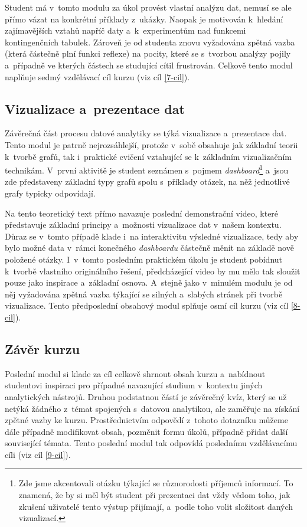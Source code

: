 Student má v~tomto modulu za úkol provést vlastní analýzu dat, nemusí se ale přímo vázat na konkrétní příklady z~ukázky. Naopak je motivován k~hledání zajímavějších vztahů napříč daty a~k~experimentům nad funkcemi kontingenčních tabulek. Zároveň je od studenta znovu vyžadována zpětná vazba (která částečně plní funkci reflexe) na pocity, které se s~tvorbou analýzy pojily a~případně ve kterých částech se studující cítil frustrován. Celkově tento modul naplňuje sedmý vzdělávací cíl kurzu (viz cíl \ref{7-cil}).

\hypertarget{vizualizace-a-prezentace-dat}{%
\subsection{Vizualizace a~prezentace dat}\label{vizualizace-a-prezentace-dat}}

Závěrečná část procesu datové analytiky se týká vizualizace a~prezentace dat. Tento modul je patrně nejrozsáhlejší, protože v~sobě obsahuje jak základní teorii k~tvorbě grafů, tak i~praktické cvičení vztahující se k~základním vizualizačním technikám. V~první aktivitě je student seznámen s~pojmem \emph{dashboard}\footnote{Zde jsme akcentovali otázku týkající se různorodosti příjemců informací. To znamená, že by si měl být student při prezentaci dat vždy vědom toho, jak zkušení uživatelé tento výstup přijímají, a~podle toho volit složitost daných vizualizací.} a~jsou zde představeny základní typy grafů spolu s~příklady otázek, na něž jednotlivé grafy typicky odpovídají.

Na tento teoretický text přímo navazuje poslední demonstrační video, které představuje základní principy a~možnosti vizualizace dat v~našem kontextu. Důraz se v~tomto případě klade i~na interaktivitu výsledné vizualizace, tedy aby bylo možné data v~rámci konečného \emph{dashboardu} částečně měnit na základě nově položené otázky. I~v~tomto posledním praktickém úkolu je student pobídnut k~tvorbě vlastního originálního řešení, předcházející video by mu mělo tak sloužit pouze jako inspirace a~základní osnova. A~stejně jako v~minulém modulu je od něj vyžadována zpětná vazba týkající se silných a~slabých stránek při tvorbě vizualizace. Tento předposlední obsahový modul splňuje osmí cíl kurzu (viz cíl \ref{8-cil}).

\hypertarget{zuxe1vux11br-kurzu}{%
\subsection{Závěr kurzu}\label{zuxe1vux11br-kurzu}}

Poslední modul si klade za cíl celkově shrnout obsah kurzu a~nabídnout studentovi inspiraci pro případné navazující studium v~kontextu jiných analytických nástrojů. Druhou podstatnou částí je závěrečný kvíz, který se už netýká žádného z~témat spojených s~datovou analytikou, ale zaměřuje na získání zpětné vazby ke kurzu. Prostřednictvím odpovědí z~tohoto dotazníku můžeme dále případně modifikovat obsah, pozměnit formu úkolů, případně přidat další související témata. Tento poslední modul tak odpovídá poslednímu vzdělávacímu cíli (viz cíl \ref{9-cil}).
